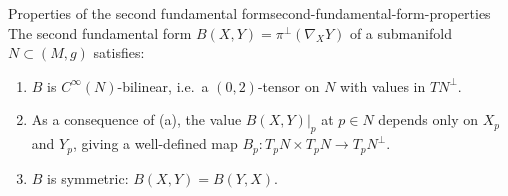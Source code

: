 





\begin{colortheo}{Properties of the second fundamental form}{second-fundamental-form-properties}
The second fundamental form $B(X, Y) = \pi^\perp(\nabla_X Y)$ of a submanifold $N \subset (M, g)$ satisfies:
\begin{enumerate}
    \item[(a)] $B$ is $C^\infty(N)$-bilinear, i.e.\ a $(0, 2)$-tensor on $N$ with values in $TN^\perp$.
    \item[(b)] As a consequence of (a), the value $B(X, Y)|_p$ at $p \in N$ depends only on $X_p$ and $Y_p$, giving a well-defined map $B_p \colon T_p N \times T_p N \to T_p N^\perp$.
    \item[(c)] $B$ is symmetric: $B(X, Y) = B(Y, X)$.
\end{enumerate}
\end{colortheo}

